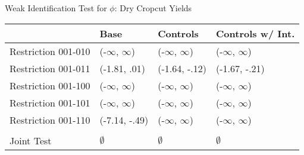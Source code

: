 

\caption{Weak Identification Test for $\phi$: Dry Cropcut Yields \label{tbl:phi_cropcut}}
\begin{tabular}{llll}
\toprule
{} &           Base &       Controls & Controls w/ Int. \\
\midrule
Restriction 001-010 &      (-$\infty$, $\infty$) &      (-$\infty$, $\infty$) &        (-$\infty$, $\infty$) \\
Restriction 001-011 &   (-1.81, .01) &  (-1.64, -.12) &    (-1.67, -.21) \\
Restriction 001-100 &      (-$\infty$, $\infty$) &      (-$\infty$, $\infty$) &        (-$\infty$, $\infty$) \\
Restriction 001-101 &      (-$\infty$, $\infty$) &      (-$\infty$, $\infty$) &        (-$\infty$, $\infty$) \\
Restriction 001-110 &  (-7.14, -.49) &      (-$\infty$, $\infty$) &        (-$\infty$, $\infty$) \\
\hline\\Joint Test  &         $\emptyset$ &         $\emptyset$ &           $\emptyset$ \\
\bottomrule
\end{tabular}
